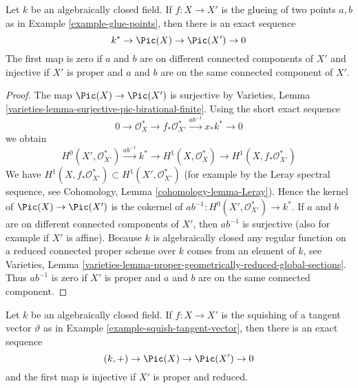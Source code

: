 \begin{lemma}
\label{lemma-glue-points}
Let $k$ be an algebraically closed field. If $f : X \to X'$ is the
glueing of two points $a, b$ as in Example \ref{example-glue-points}, then
there is an exact sequence
$$
k^* \to \Pic(X) \to \Pic(X') \to 0
$$
The first map is zero if $a$ and $b$ are on different
connected components of $X'$ and injective
if $X'$ is proper and $a$ and $b$ are on the same connected component of $X'$.
\end{lemma}

\begin{proof}
The map $\Pic(X) \to \Pic(X')$ is surjective
by Varieties, Lemma \ref{varieties-lemma-surjective-pic-birational-finite}.
Using the short exact sequence
$$
0 \to \mathcal{O}_X^* \to f_*\mathcal{O}_{X'}^*
\xrightarrow{ab^{-1}} x_*k^* \to 0
$$
we obtain
$$
H^0(X', \mathcal{O}_{X'}^*) \xrightarrow{ab^{-1}} k^* \to
H^1(X, \mathcal{O}_X^*) \to H^1(X, f_*\mathcal{O}_{X'}^*)
$$
We have $H^1(X, f_*\mathcal{O}_{X'}^*) \subset H^1(X', \mathcal{O}_{X'}^*)$
(for example by the Leray spectral sequence, see
Cohomology, Lemma \ref{cohomology-lemma-Leray}).
Hence the kernel of $\Pic(X) \to \Pic(X')$ is the
cokernel of $ab^{-1} : H^0(X', \mathcal{O}_{X'}^*) \to k^*$.
If $a$ and $b$ are on different connected components of $X'$,
then $ab^{-1}$ is surjective (also for example if $X'$ is affine).
Because $k$ is algebraically closed any regular function on a
reduced connected proper scheme over $k$ comes from an element of $k$, see
Varieties, Lemma
\ref{varieties-lemma-proper-geometrically-reduced-global-sections}.
Thus $ab^{-1}$ is zero if $X'$ is proper and $a$ and $b$ are on
the same connected component.
\end{proof}

\begin{lemma}
\label{lemma-squish-tangent-vector}
Let $k$ be an algebraically closed field. If $f : X \to X'$ is the
squishing of a tangent vector $\vartheta$ as in
Example \ref{example-squish-tangent-vector}, then
there is an exact sequence
$$
(k, +) \to \Pic(X) \to \Pic(X') \to 0
$$
and the first map is injective if $X'$ is proper and reduced.
\end{lemma}


